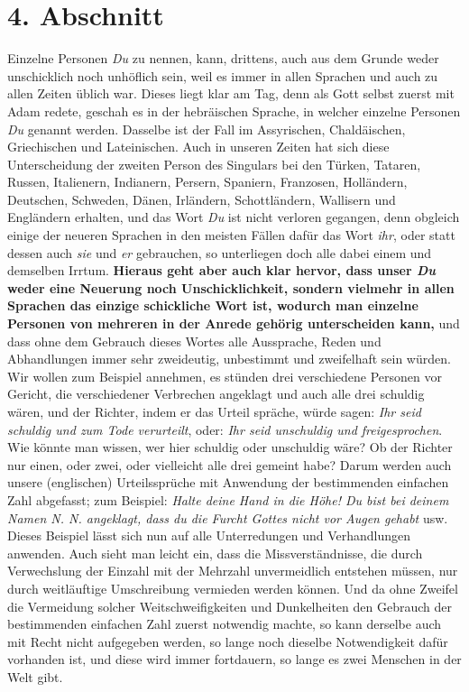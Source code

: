 \section{4. Abschnitt} \label{kap10_ab4}

Einzelne Personen \textit{Du} zu nennen, kann, drittens, auch aus dem Grunde
weder
unschicklich noch unhöflich sein, weil es immer in allen Sprachen und auch zu
allen Zeiten üblich war. Dieses liegt klar am Tag, denn als Gott selbst zuerst
mit Adam redete, geschah es in der hebräischen Sprache, in welcher einzelne
Personen \textit{Du} genannt werden. Dasselbe ist der Fall im
Assyrischen,
Chaldäischen, Griechischen
und Lateinischen. Auch in unseren Zeiten hat sich
diese Unterscheidung der zweiten Person des Singulars bei den
Türken, Tataren,
Russen, Italienern,
Indianern, Persern,
Spaniern, Franzosen,
Holländern,
Deutschen, Schweden,
Dänen, Irländern,
Schottländern, Wallisern
und Engländern erhalten, und das Wort \textit{Du}
ist nicht verloren gegangen,
denn obgleich einige der neueren Sprachen in den meisten Fällen dafür das Wort
\textit{ihr}, oder statt dessen auch \textit{sie} und \textit{er} gebrauchen, so
unterliegen
doch alle dabei einem und demselben Irrtum. \textbf{Hieraus geht aber auch
klar
hervor, dass unser \textit{Du} weder eine Neuerung noch Unschicklichkeit,
sondern
vielmehr in allen Sprachen das einzige schickliche Wort ist, wodurch man
einzelne Personen von mehreren in der Anrede gehörig unterscheiden kann,} und
dass
ohne dem Gebrauch dieses Wortes alle Aussprache, Reden und Abhandlungen immer
sehr zweideutig, unbestimmt und zweifelhaft sein würden. Wir wollen zum Beispiel
annehmen, es stünden drei verschiedene Personen vor Gericht, die verschiedener
Verbrechen angeklagt und auch alle drei schuldig wären, und der Richter, indem
er das Urteil spräche, würde sagen: \textit{Ihr seid schuldig und zum Tode
verurteilt},
oder: \textit{Ihr seid unschuldig und freigesprochen}. Wie könnte man wissen,
wer hier
schuldig oder unschuldig wäre? Ob der Richter nur einen, oder zwei, oder
vielleicht alle drei gemeint habe? Darum werden auch unsere (englischen)
Urteilssprüche mit Anwendung der bestimmenden einfachen Zahl abgefasst; zum Beispiel:
\textit{Halte deine Hand in die Höhe! Du bist bei deinem Namen N. N. angeklagt,
dass du
die Furcht Gottes nicht vor Augen gehabt} usw. Dieses Beispiel lässt sich nun
auf alle Unterredungen und Verhandlungen anwenden. Auch sieht man leicht ein,
dass die Missverständnisse, die durch Verwechslung der Einzahl mit der Mehrzahl
unvermeidlich entstehen müssen, nur durch weitläuftige Umschreibung vermieden
werden können. Und da ohne Zweifel die Vermeidung solcher Weitschweifigkeiten
und Dunkelheiten den Gebrauch der bestimmenden einfachen Zahl zuerst notwendig
machte, so kann derselbe auch mit Recht nicht aufgegeben werden, so lange noch
dieselbe Notwendigkeit dafür vorhanden ist, und diese wird immer fortdauern, so
lange es zwei Menschen in der Welt gibt.

